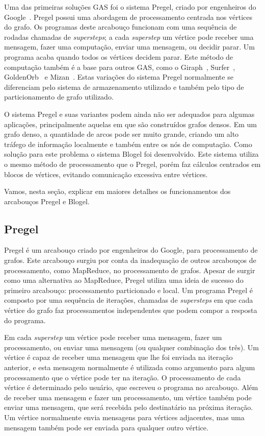 \documentclass[conference]{IEEEtran}
\begin{document}
Uma das primeiras soluções GAS foi o sistema Pregel, criado por
engenheiros do Google~\cite{pregel}. Pregel possui uma abordagem de
processamento centrada nos vértices do grafo. Os programas deste
arcabouço funcionam com uma sequência de rodadas chamadas de {\em
supersteps}; a cada {\em superstep} um vértice pode receber uma
mensagem, fazer uma computação, enviar uma mensagem, ou decidir parar.
Um programa acaba quando todos os vértices decidem parar. Este método de
computação também é a base para outros GAS, como o Giraph~\cite{giraph},
Surfer~\cite{surfer}, GoldenOrb~\cite{goldenorb} e Mizan~\cite{mizan}.
Estas variações do sistema Pregel normalmente se diferenciam pelo
sistema de armazenamento utilizado e também pelo tipo de particionamento
de grafo utilizado.

O sistema Pregel e suas variantes podem ainda não ser adequados para
algumas aplicações, principalmente aquelas em que são construídos grafos
densos. Em um grafo denso, a quantidade de arcos pode ser muito grande,
criando um alto tráfego de informação localmente e também entre os nós
de computação. Como solução para este problema o sistema Blogel foi
desenvolvido. Este sistema utiliza o mesmo método de processamento que o
Pregel, porém faz cálculos centrados em blocos de vértices, evitando
comunicação excessiva entre vértices.

Vamos, nesta seção, explicar em maiores detalhes os funcionamentos dos
arcabouços Pregel e Blogel.

\subsection{Pregel}
Pregel é um arcabouço criado por engenheiros do Google, para
processamento de grafos. Este arcabouço surgiu por conta da inadequação
de outros arcabouços de processamento, como MapReduce, no processamento
de grafos. Apesar de surgir como uma alternativa ao MapReduce, Pregel
utiliza uma ideia de sucesso do primeiro arcabouço: processamento
particionado e local. Um programa Pregel é composto por uma sequência
de iterações, chamadas de {\em supersteps} em que cada vértice do grafo
faz processamentos independentes que podem compor a resposta do
programa.

Em cada {\em superstep} um vértice pode receber uma mensagem, fazer um
processamento, ou enviar uma mensagem (ou qualquer combinação dos três).
Um vértice é capaz de receber uma mensagem que lhe foi enviada na
iteração anterior, e esta mensagem normalmente é utilizada como
argumento para algum processamento que o vértice pode ter na iteração. O
processamento de cada vértice é determinado pelo usuário, que escreveu o
programa no arcabouço. Além de receber uma mensagem e fazer um
processamento, um vértice também pode enviar uma mensagem, que será
recebida pelo destinatário na próxima iteração. Um vértice normalmente
envia mensagens para vértices adjacentes, mas uma mensagem também pode
ser enviada para qualquer outro vértice.
\end{document}
